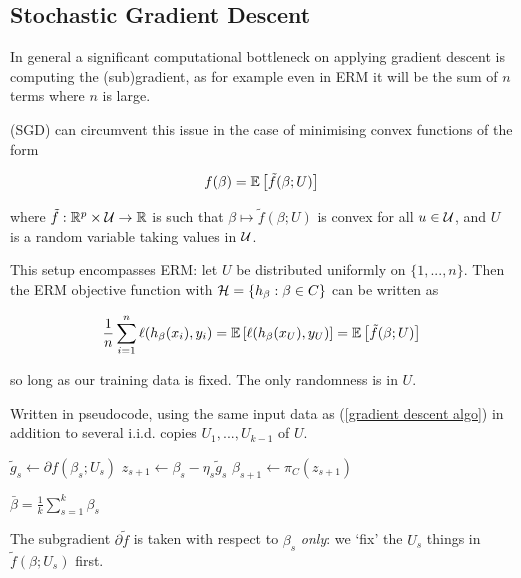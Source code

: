 \documentclass[11pt]{scrartcl}
\begin{document}
\subsection{Stochastic Gradient Descent}

In general a significant computational bottleneck on applying gradient descent is computing the (sub)gradient, as for example even in ERM it will be the sum of $n$ terms where $n$ is large.

 (SGD) can circumvent this issue in the case of minimising convex functions of the form

\begin{equation}
    f(\beta) = \mathbb{E} \left[  \tilde{f} (\beta; U) \right]
\end{equation}

where $\tilde{f} : \mathbb R^p \times \mathcal{U} \rightarrow \mathbb R$ is such that $\beta \mapsto \tilde{f} (\beta; U)$ is convex for all $u \in \mathcal{U}$, and $U$ is a random variable taking values in $\mathcal{U}$.

\begin{example}
This setup encompasses ERM: let $U$ be distributed uniformly on $\{ 1, ... , n \}$. Then the ERM objective function with $\mathcal{H} = \{ h_\beta : \beta \in C \}$ can be written as 

\begin{equation}
    \frac1n \sum_{i=1}^n \ell(h_\beta(x_i), y_i) = \mathbb{E} \left[  \ell(h_\beta(x_U), y_U) \right] = \mathbb{E} \left[ \tilde{f} (\beta; U) \right] 
\end{equation}

so long as our training data is fixed. The only randomness is in $U$.
\end{example}

Written in pseudocode, using the same input data as (\ref{gradient descent algo}) in addition to several i.i.d. copies $U_1, ... , U_{k-1}$ of $U$.

\begin{algorithmic}
    \State $\tilde{g}_s \gets \partial f(\beta_s; U_s)$ 
    \State $z_{s+1} \gets \beta_s - \eta_s \tilde{g}_s$
    \State $\beta_{s+1} \gets \pi_C(z_{s+1})$
\EndFor

\Return $\bar{\beta} = \frac{1}{k} \sum_{s=1}^k \beta_s$ 
\label{SGD gradient descent algo}
\end{algorithmic}

\begin{remark}
\label{subg rema}
The subgradient $\partial \tilde{f}$ is taken with respect to $\beta_s$ \textit{only}: we `fix' the $U_s$ things in $\tilde{f}(\beta; U_s)$ first.
\end{remark}
\end{document}
